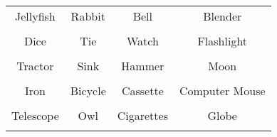 \documentclass[12pt,a4paper]{article}
\begin{document}
\thispagestyle{empty}
\begin{table}[]
\centering
\Huge
\begin{tabular}{cccc}
 Jellyfish& Rabbit& Bell& Blender\\  & & & \\
 Dice& Tie& Watch& Flashlight\\  & & & \\
 Tractor& Sink& Hammer& Moon\\  & & & \\
 Iron& Bicycle& Cassette& Computer Mouse\\  & & & \\
 Telescope& Owl& Cigarettes& Globe\\  & & & \\
\end{tabular}
\end{table}
\end{document}
